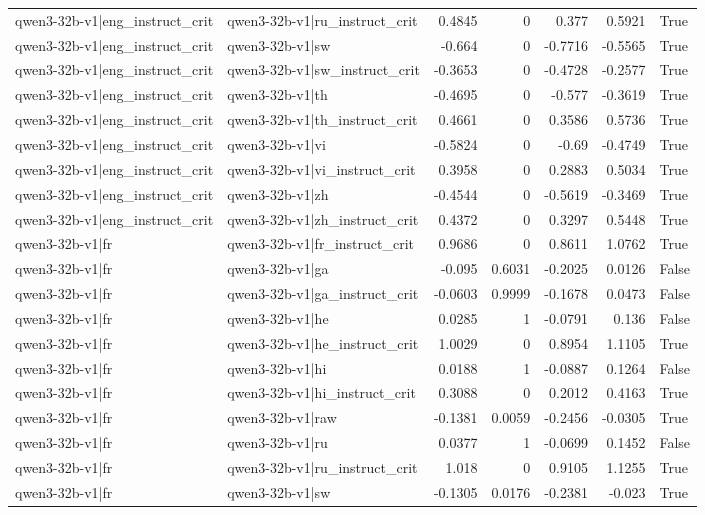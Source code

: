 \begin{table}
\begin{tabular}{l l r r r r l}
qwen3-32b-v1|eng_instruct_crit & qwen3-32b-v1|ru_instruct_crit & 0.4845 & 0 & 0.377 & 0.5921 & True \\
qwen3-32b-v1|eng_instruct_crit & qwen3-32b-v1|sw & -0.664 & 0 & -0.7716 & -0.5565 & True \\
qwen3-32b-v1|eng_instruct_crit & qwen3-32b-v1|sw_instruct_crit & -0.3653 & 0 & -0.4728 & -0.2577 & True \\
qwen3-32b-v1|eng_instruct_crit & qwen3-32b-v1|th & -0.4695 & 0 & -0.577 & -0.3619 & True \\
qwen3-32b-v1|eng_instruct_crit & qwen3-32b-v1|th_instruct_crit & 0.4661 & 0 & 0.3586 & 0.5736 & True \\
qwen3-32b-v1|eng_instruct_crit & qwen3-32b-v1|vi & -0.5824 & 0 & -0.69 & -0.4749 & True \\
qwen3-32b-v1|eng_instruct_crit & qwen3-32b-v1|vi_instruct_crit & 0.3958 & 0 & 0.2883 & 0.5034 & True \\
qwen3-32b-v1|eng_instruct_crit & qwen3-32b-v1|zh & -0.4544 & 0 & -0.5619 & -0.3469 & True \\
qwen3-32b-v1|eng_instruct_crit & qwen3-32b-v1|zh_instruct_crit & 0.4372 & 0 & 0.3297 & 0.5448 & True \\
qwen3-32b-v1|fr & qwen3-32b-v1|fr_instruct_crit & 0.9686 & 0 & 0.8611 & 1.0762 & True \\
qwen3-32b-v1|fr & qwen3-32b-v1|ga & -0.095 & 0.6031 & -0.2025 & 0.0126 & False \\
qwen3-32b-v1|fr & qwen3-32b-v1|ga_instruct_crit & -0.0603 & 0.9999 & -0.1678 & 0.0473 & False \\
qwen3-32b-v1|fr & qwen3-32b-v1|he & 0.0285 & 1 & -0.0791 & 0.136 & False \\
qwen3-32b-v1|fr & qwen3-32b-v1|he_instruct_crit & 1.0029 & 0 & 0.8954 & 1.1105 & True \\
qwen3-32b-v1|fr & qwen3-32b-v1|hi & 0.0188 & 1 & -0.0887 & 0.1264 & False \\
qwen3-32b-v1|fr & qwen3-32b-v1|hi_instruct_crit & 0.3088 & 0 & 0.2012 & 0.4163 & True \\
qwen3-32b-v1|fr & qwen3-32b-v1|raw & -0.1381 & 0.0059 & -0.2456 & -0.0305 & True \\
qwen3-32b-v1|fr & qwen3-32b-v1|ru & 0.0377 & 1 & -0.0699 & 0.1452 & False \\
qwen3-32b-v1|fr & qwen3-32b-v1|ru_instruct_crit & 1.018 & 0 & 0.9105 & 1.1255 & True \\
qwen3-32b-v1|fr & qwen3-32b-v1|sw & -0.1305 & 0.0176 & -0.2381 & -0.023 & True \\

\end{tabular}
\end{table}

